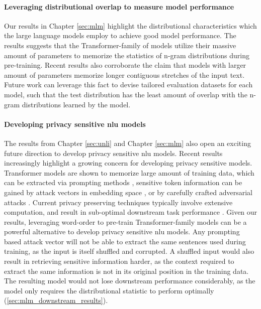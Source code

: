 \documentclass[letterpaper, 12pt]{report}
\begin{document}
\paragraph{Leveraging distributional overlap to measure model performance} Our results in Chapter \autoref{sec:mlm} highlight the distributional characteristics which the large language models employ to achieve good model performance. The results suggests that the Transformer-family of models utilize their massive amount of parameters to memorize the statistics of n-gram distributions during pre-training. Recent results \citep{feldman2020neural, carlini2021, carlini2022a} also corroborate the claim that models with larger amount of parameters memorize longer contiguous stretches of the input text. Future work can leverage this fact to devise tailored evaluation datasets for each model, such that the test distribution has the least amount of overlap with the n-gram distributions learned by the model.

\paragraph{Developing privacy sensitive \acrshort{nlu} models}
The results from Chapter \autoref{sec:unli} and Chapter \autoref{sec:mlm} also open an exciting future direction to develop privacy sensitive \acrshort{nlu} models. Recent results increasingly highlight a growing concern for developing privacy sensitive models. Transformer models are shown to memorize large amount of training data, which can be extracted via prompting methods \citep{carlini2021, carlini2022a}, sensitive token information can be gained by attack vectors in embedding space \citep{song2020information}, or by carefully crafted adversarial attacks \citep{henderson2018ethical}. Current privacy preserving techniques typically involve extensive computation, and result in sub-optimal downstream task performance \citep{jayaraman2019evaluating}. Given our results, leveraging word-order to pre-train Transformer-family models can be a powerful alternative to develop privacy sensitive \acrshort{nlu} models. Any prompting based attack vector will not be able to extract the same sentences used during training, as the input is itself shuffled and corrupted. A shuffled input would also result in retrieving sensitive information harder, as the context required to extract the same information is not in its original position in the training data. The resulting model would not lose downstream performance considerably, as the model only requires the distributional statistic to perform optimally (\autoref{sec:mlm_downstream_results}).
\end{document}
